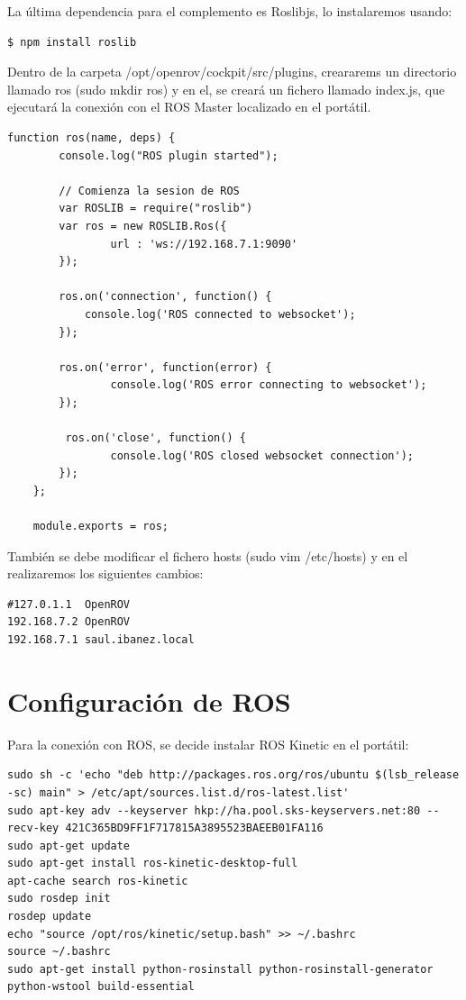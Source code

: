 La última dependencia para el complemento es Roslibjs, lo instalaremos usando: 
\renewcommand{\lstlistingname}{}
\begin{lstlisting}[caption=Roslib, label={lst:roslib}]
$ npm install roslib
\end{lstlisting}

Dentro de la carpeta /opt/openrov/cockpit/src/plugins, creararems un directorio llamado ros (sudo mkdir ros) y en el, se creará un fichero llamado index.js, que ejecutará la conexión con el ROS Master localizado en el portátil.
\newpage
\renewcommand{\lstlistingname}{}
\begin{lstlisting}[caption=Conexión con ROS, label={lst:conection_ros}]
function ros(name, deps) {
  		console.log("ROS plugin started");

  		// Comienza la sesion de ROS
 		var ROSLIB = require("roslib")
  		var ros = new ROSLIB.Ros({
    			url : 'ws://192.168.7.1:9090'
  		});

  		ros.on('connection', function() {
   			console.log('ROS connected to websocket');
  		});

  		ros.on('error', function(error) {
    			console.log('ROS error connecting to websocket');
  		});

 		 ros.on('close', function() {
    			console.log('ROS closed websocket connection');
 		});
	};

	module.exports = ros;
\end{lstlisting}

También se debe modificar el fichero hosts (sudo vim /etc/hosts) y en el realizaremos los siguientes cambios:

\begin{lstlisting}[caption=/etc/hosts, label={lst:hosts}]
#127.0.1.1	OpenROV
192.168.7.2	OpenROV
192.168.7.1	saul.ibanez.local
\end{lstlisting}

\section{Configuración de ROS}
\label{cap:Configuracion de ROS}
Para la conexión con ROS, se decide instalar ROS Kinetic en el portátil:

\begin{lstlisting}[caption=Instalacion de ROS, label={lst:install_ros}]
sudo sh -c 'echo "deb http://packages.ros.org/ros/ubuntu $(lsb_release -sc) main" > /etc/apt/sources.list.d/ros-latest.list'
sudo apt-key adv --keyserver hkp://ha.pool.sks-keyservers.net:80 --recv-key 421C365BD9FF1F717815A3895523BAEEB01FA116
sudo apt-get update
sudo apt-get install ros-kinetic-desktop-full
apt-cache search ros-kinetic
sudo rosdep init
rosdep update
echo "source /opt/ros/kinetic/setup.bash" >> ~/.bashrc
source ~/.bashrc
sudo apt-get install python-rosinstall python-rosinstall-generator python-wstool build-essential
\end{lstlisting}


